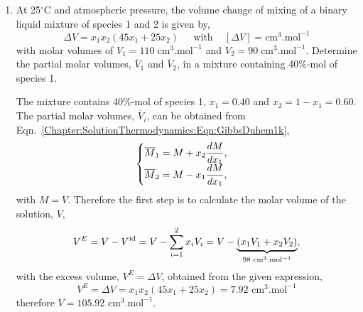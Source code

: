 \begin{enumerate}[1)]
   \item\label{Mod05Ex01} At 25$^{\circ}$C and atmospheric pressure, the volume change of mixing of a binary liquid mixture of species 1 and 2 is given by,
       \begin{displaymath}
          \Delta V = x_{1}x_{2}\left(45x_{1}+25x_{2}\right)\;\;\;\;\text{ with }\;\;\;\left[\Delta V\right] = \text{cm}^{3}.\text{mol}^{-1}
       \end{displaymath}
       with molar volumes of $V_{1} = 110\;\text{cm}^{3}.\text{mol}^{-1}$ and $V_{2} = 90\;\text{cm}^{3}.\text{mol}^{-1}$. Determine the partial molar volumes, $\overline{V}_{1}$ and $\overline{V}_{2}$, in a mixture containing 40$\%$-mol of species 1.

        The mixture contains 40$\%$-mol of species 1, \ie $x_{1}=0.40$ and $x_{2}=1-x_{1}=0.60$. The partial molar volumes, $\overline{V}_{i}$, can be obtained from Eqn.~\ref{Chapter:SolutionThermodynamics:Eqn:GibbsDuhem1k}, 
               \begin{displaymath}
                 \begin{cases}
                    \overline{M}_{1} = M + x_{2}\frc{dM}{dx_{1}},\\
                    \overline{M}_{2} = M - x_{1}\frc{dM}{dx_{1}},
                 \end{cases}
              \end{displaymath}
              with $M=V$. Therefore the first step is to calculate the molar volume of the solution, $V$,
                 \begin{displaymath}
                    V^{E} = V - V^{\text{id}} = V - \summation[x_{i}V_{i}]{i=1}{2} = V - \underbrace{\left(x_{1}V_{1} + x_{2}V_{2}\right)}_{98\text{ cm}^{3}.\text{mol}^{-1}},
                 \end{displaymath}
              with the excess volume, $V^{E}=\Delta V$, obtained from the given expression,
                 \begin{displaymath}
                    V^{E} = \Delta V = x_{1}x_{2}\left(45x_{1}+25x_{2}\right) = 7.92\text{ cm}^{3}.\text{mol}^{-1}
                 \end{displaymath}
              therefore $V=105.92\text{ cm}^{3}.\text{mol}^{-1}$.
\medskip


\end{enumerate}

